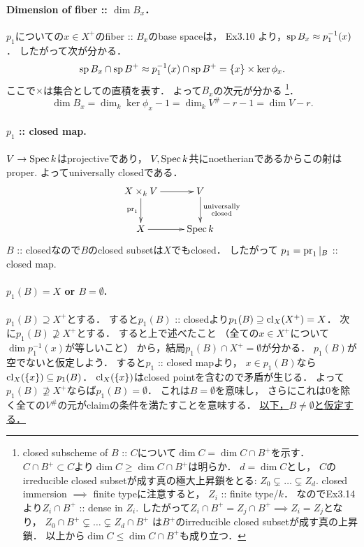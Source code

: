 \documentclass[a4paper]{jsarticle}
\begin{document}
    \paragraph{Dimension of fiber :: $\dim B_x$．}
    $p_1$についての$x \in X^+$のfiber :: $B_x$のbase spaceは，
    Ex3.10 より，$\operatorname{sp} B_x \approx p_1^{-1}(x)$．
    したがって次が分かる．
    \[ \operatorname{sp} B_x \cap \operatorname{sp} B^+ \approx p_1^{-1}(x) \cap \operatorname{sp} B^+=\{x\} \times \ker \phi_x. \]
    ここで$\times$は集合としての直積を表す．
    よって$B_x$の次元が分かる
    \footnote
    {
        closed subscheme of $B$ :: $C$について$\dim C=\dim C \cap B^+$を示す．
        $C \cap B^+ \subset C$より$\dim C \geq \dim C \cap B^+$は明らか．
        $d=\dim C$とし，
        $C$のirreducible closed subsetが成す真の極大上昇鎖をとる:
        $Z_0 \subsetneq \dots \subsetneq Z_d.$
        closed immersion $\implies$ finite typeに注意すると，
        $Z_i$ :: finite type/$k$．
        なのでEx3.14より$Z_i \cap B^+$ :: dense in $Z_i$.
        したがって$Z_i \cap B^+=Z_j \cap B^+ \implies Z_i=Z_j$となり，
        $Z_0 \cap B^+ \subsetneq \dots \subsetneq Z_d \cap B^+$
        は$B^+$のirreducible closed subsetが成す真の上昇鎖．
        以上から$\dim C \leq \dim C \cap B^+$も成り立つ．
    }．
    \[ \dim B_x=\dim_k \ker \phi_x-1=\dim_k V^{\#}-r-1=\dim V-r. \]

    \paragraph{$p_1$ :: closed map.}
    $V \to \operatorname{Spec} k$はprojectiveであり，
    $V, \operatorname{Spec} k$共にnoetherianであるからこの射はproper.
    よってuniversally closedである．
    \[
    \xymatrix
    {
        X \times_k V \ar[r]\ar[d]_-{\pr_1}& V
            \ar[d]^-{\substack{\text{universally} \\ \text{closed}}}\\
        X \ar[r]& \Spec k
    }
    \]
    $B$ :: closedなので$B$のclosed subsetは$X$でもclosed．
    したがって
    $p_1=\operatorname{pr}_1|_B$ :: closed map.

    \paragraph{$p_1(B)=X$ or $B=\emptyset$.}
    $p_1(B) \supseteq X^+$とする．
    すると$p_1(B)$ :: closedより$p_1(B) \supseteq \operatorname{cl}_X(X^+)=X$．
    次に$p_1(B) \not \supseteq X^+$とする．
    すると上で述べたこと
    （全ての$x \in X^+$について$\dim p_1^{-1}(x)$が等しいこと）
    から，結局$p_1(B) \cap X^+=\emptyset$が分かる．
    $p_1(B)$が空でないと仮定しよう．
    すると$p_1$ :: closed mapより，
    $x \in p_1(B)$なら$\operatorname{cl}_X(\{x\}) \subseteq p_1(B)$．
    $\operatorname{cl}_X(\{x\})$はclosed pointを含むので矛盾が生じる．
    よって$p_1(B) \not \supseteq X^+$ならば$p_1(B)=\emptyset$．
    これは$B=\emptyset$を意味し，
    さらにこれは$0$を除く全ての$V^{\#}$の元がclaimの条件を満たすことを意味する．
    \underline{以下，$B \neq \emptyset$と仮定する．}
\end{document}
